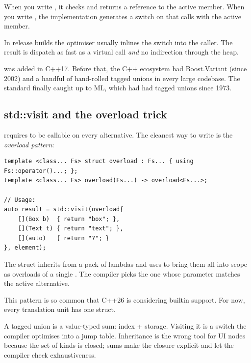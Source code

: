 When you write , it checks 
and returns a reference to the active member. When you write
, the implementation generates a switch
on  that calls  with the active member.

In release builds the optimiser usually inlines the switch into
the caller. The result is dispatch as fast as a virtual call
\emph{and} no indirection through the heap.

\begin{funfact}
 was added in C++17. Before that, the
C++ ecosystem had Boost.Variant (since 2002) and a handful of
hand-rolled tagged unions in every large codebase. The standard
finally caught up to ML, which had had tagged unions since 1973.
\end{funfact}

\subsection*{std::visit and the overload trick}

 requires  to be callable on every
alternative. The cleanest way to write  is the
\emph{overload pattern}:

\begin{lstlisting}
template <class... Fs> struct overload : Fs... { using Fs::operator()...; };
template <class... Fs> overload(Fs...) -> overload<Fs...>;

// Usage:
auto result = std::visit(overload{
    [](Box b)  { return "box"; },
    [](Text t) { return "text"; },
    [](auto)   { return "?"; }
}, element);
\end{lstlisting}

The  struct inherits from a pack of lambdas and
uses  to bring them all into scope
as overloads of a single . The compiler picks
the one whose parameter matches the active alternative.

This pattern is so common that C++26 is considering builtin
support. For now, every \maya{} translation unit has one
 struct.

\begin{recap}
A tagged union is a value-typed sum: index + storage. Visiting it
is a switch the compiler optimises into a jump table. Inheritance
is the wrong tool for UI nodes because the set of kinds is
closed; sums make the closure explicit and let the compiler
check exhaustiveness.
\end{recap}

